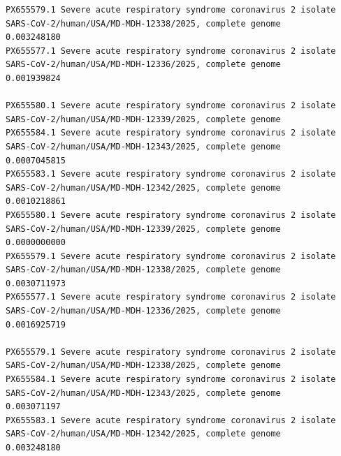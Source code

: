 \documentclass[
  11pt,
]{article}
\newenvironment{rpoutput}{\vspace{0.5em}\begin{snugshade}}{\end{snugshade}}
\begin{document}
\begin{rpoutput}
\begin{verbatim}
PX655579.1 Severe acute respiratory syndrome coronavirus 2 isolate SARS-CoV-2/human/USA/MD-MDH-12338/2025, complete genome                                                                                                                0.003248180
PX655577.1 Severe acute respiratory syndrome coronavirus 2 isolate SARS-CoV-2/human/USA/MD-MDH-12336/2025, complete genome                                                                                                                0.001939824
                                                                                                                           PX655580.1 Severe acute respiratory syndrome coronavirus 2 isolate SARS-CoV-2/human/USA/MD-MDH-12339/2025, complete genome
PX655584.1 Severe acute respiratory syndrome coronavirus 2 isolate SARS-CoV-2/human/USA/MD-MDH-12343/2025, complete genome                                                                                                               0.0007045815
PX655583.1 Severe acute respiratory syndrome coronavirus 2 isolate SARS-CoV-2/human/USA/MD-MDH-12342/2025, complete genome                                                                                                               0.0010218861
PX655580.1 Severe acute respiratory syndrome coronavirus 2 isolate SARS-CoV-2/human/USA/MD-MDH-12339/2025, complete genome                                                                                                               0.0000000000
PX655579.1 Severe acute respiratory syndrome coronavirus 2 isolate SARS-CoV-2/human/USA/MD-MDH-12338/2025, complete genome                                                                                                               0.0030711973
PX655577.1 Severe acute respiratory syndrome coronavirus 2 isolate SARS-CoV-2/human/USA/MD-MDH-12336/2025, complete genome                                                                                                               0.0016925719
                                                                                                                           PX655579.1 Severe acute respiratory syndrome coronavirus 2 isolate SARS-CoV-2/human/USA/MD-MDH-12338/2025, complete genome
PX655584.1 Severe acute respiratory syndrome coronavirus 2 isolate SARS-CoV-2/human/USA/MD-MDH-12343/2025, complete genome                                                                                                                0.003071197
PX655583.1 Severe acute respiratory syndrome coronavirus 2 isolate SARS-CoV-2/human/USA/MD-MDH-12342/2025, complete genome                                                                                                                0.003248180

\end{verbatim}
\end{rpoutput}
\end{document}
